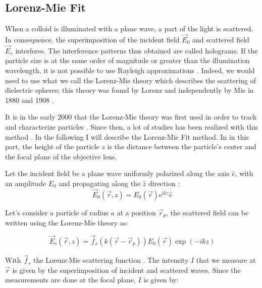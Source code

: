 \subsection{Lorenz-Mie Fit}
\label{chap:LM_fit}

When a colloid is illuminated with a plane wave, a part of the light is scattered. In consequence, the superimposition of the incident field $\vec{E}_0$ and scattered field $\vec{E}_s$ interferes. The interference patterns thus obtained are called holograms. If the particle size is at the same order of magnitude or greater than the illumination wavelength, it is not possible to use Rayleigh approximations \cite{strutt_lviii_1871}. Indeed, we would need to use what we call  the Lorenz-Mie theory which describes the scattering of dielectric spheres; this theory was found by Lorenz and independently by Mie in 1880 and 1908 \cite{lorenz_lysbevaegelsen_1890, mie_beitrage_1908}. 

It is in the early 2000 that the Lorenz-Mie theory was first used in order to track and characterize particles \cite{ovryn_imaging_2000, lee_characterizing_2007}. Since then, a lot of studies has been realized with this method \cite{katz_applications_2010}. In the following I will describe the Lorenz-Mie Fit method. In in this part, the height of the particle $z$ is the distance between the particle's center and the focal plane of the objective lens.

Let the incident field be a plane wave uniformly polarized along the axis $ \hat{e}$, with an amplitude $E_0$ and propagating along the $\hat{z}$ direction :
\begin{equation}
	\vec{E}_0(\vec{r},z) = E_0(\vec{r}) \mathrm{e}^{ikz}\hat{e}
\end{equation}

Let's consider a particle of radius $a$ at a position $\vec{r}_p $, the scattered field can be written using the Lorenz-Mie theory \cite{f_bohren_absorption_1998} as:

\begin{equation}
	\vec{E}_s(\vec{r}, z) =  \vec{f}_s(k(\vec{r} - \vec{r}_p))E_0(\vec{r}) \exp \left(-ikz\right) 
\end{equation} 

With $\vec{f}_s$ the Lorenz-Mie scattering function \cite{f_bohren_absorption_1998}. The intensity $I$ that we measure at $\vec{r}$ is given by the superimposition of incident and scattered waves. Since the measurements are done at the focal plane, $I$ is given by:

